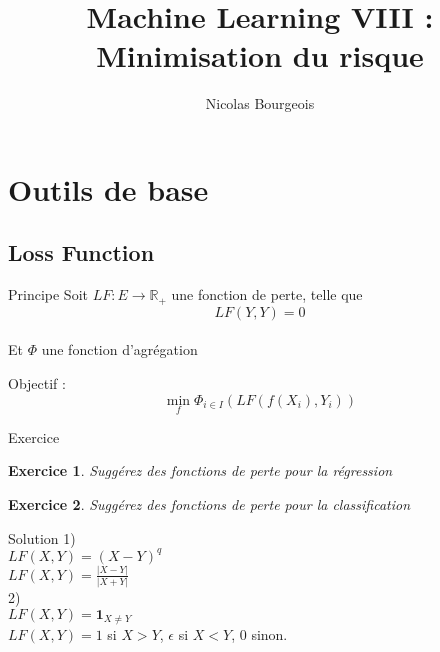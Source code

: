 \documentclass[11pt]{beamer}
\title{Machine Learning VIII : Minimisation du risque}
\author{Nicolas Bourgeois}
\date{}
\newtheorem{exercice}{Exercice}
\begin{document}
\begin{frame}
\maketitle
\end{frame}

\begin{frame}
\tableofcontents
\end{frame}


\section{Outils de base}

\subsection{Loss Function}

\begin{frame}{Principe}
Soit $LF:E \rightarrow \mathbb{R}_+$ une fonction de perte, telle que
$$LF(Y,Y) = 0$$\\
Et $\Phi$ une fonction d'agrégation

Objectif :
$$ \min_f \Phi_{i \in I} \left( LF(f(X_i),Y_i) \right)$$

\end{frame}

\begin{frame}{Exercice}
\begin{exercice}
Suggérez des fonctions de perte pour la régression
\end{exercice}

\vspace{0.3cm}

\begin{exercice}
Suggérez des fonctions de perte pour la classification
\end{exercice}
\end{frame}

\begin{frame}{Solution}
1)\\
$LF(X,Y) = (X-Y)^q$\\
$LF(X,Y) = \frac{|X-Y|}{|X+Y|}$\\
\vspace{0.3cm}
2)\\

$LF(X,Y) = \mathbf{1}_{X\neq Y}$\\
$LF(X,Y) = 1$ si $X>Y$, $\epsilon$ si $X<Y$, $0$ sinon.  

\end{frame}
\end{document}

